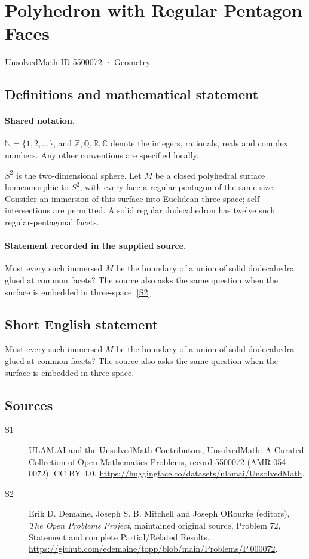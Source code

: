 \documentclass[11pt]{article}
\newcommand{\sref}[2]{\hyperlink{source:#1:#2}{[S#2]}}
\begin{document}
\setcounter{section}{5500071}
\section{Polyhedron with Regular Pentagon Faces}\label{5500072}
{\small\sffamily UnsolvedMath ID 5500072 · Geometry}
\subsection{Definitions and mathematical statement}

\paragraph{Shared notation.}$\mathbb N=\{1,2,\ldots\}$, and $\mathbb Z,\mathbb Q,\mathbb R,\mathbb C$ denote the integers, rationals, reals and complex numbers. Any other conventions are specified locally.


$S^2$ is the two-dimensional sphere. Let $M$ be a closed polyhedral surface homeomorphic to $S^2$, with every face a regular pentagon of the same size. Consider an immersion of this surface into Euclidean three-space; self-intersections are permitted. A solid regular dodecahedron has twelve such regular-pentagonal facets.
\paragraph{Statement recorded in the supplied source.}
Must every such immersed $M$ be the boundary of a union of solid dodecahedra glued at common facets? The source also asks the same question when the surface is embedded in three-space. \sref{5500072}{2}
\subsection{Short English statement}
Must every such immersed $M$ be the boundary of a union of solid dodecahedra glued at common facets? The source also asks the same question when the surface is embedded in three-space.
\subsection{Sources}
\begin{description}
\item[\hypertarget{source:5500072:1}{S1}] ULAM.AI and the UnsolvedMath Contributors, UnsolvedMath: A Curated Collection of Open Mathematics Problems, record 5500072 (AMR-054-0072). CC BY 4.0. \url{https://huggingface.co/datasets/ulamai/UnsolvedMath}.
\item[\hypertarget{source:5500072:2}{S2}] Erik D. Demaine, Joseph S. B. Mitchell and Joseph O\textquotesingle Rourke (editors), \emph{The Open Problems Project}, maintained original source, Problem 72, Statement and complete Partial/Related Results. \url{https://github.com/edemaine/topp/blob/main/Problems/P.000072}.
\end{description}
\label{end:5500072}
\end{document}
